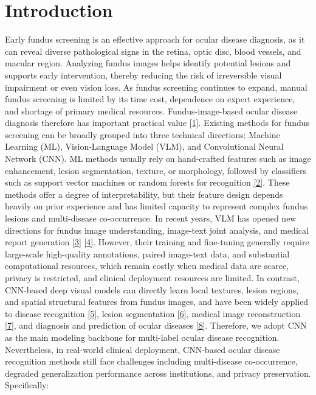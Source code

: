 
\section{Introduction}

Early fundus screening is an effective approach for ocular disease diagnosis, as it can reveal diverse pathological signs in the retina, optic disc, blood vessels, and macular region. Analyzing fundus images helps identify potential lesions and supports early intervention, thereby reducing the risk of irreversible visual impairment or even vision loss. As fundus screening continues to expand, manual fundus screening is limited by its time cost, dependence on expert experience, and shortage of primary medical resources. Fundus-image-based ocular disease diagnosis therefore has important practical value \hyperref[_Ref213949315]{{[}1{]}}. Existing methods for fundus screening can be broadly grouped into three technical directions: Machine Learning (ML), Vision-Language Model (VLM), and Convolutional Neural Network (CNN). ML methods usually rely on hand-crafted features such as image enhancement, lesion segmentation, texture, or morphology, followed by classifiers such as support vector machines or random forests for recognition \hyperref[_RefRahman2022MLFundus]{{[}2{]}}. These methods offer a degree of interpretability, but their feature design depends heavily on prior experience and has limited capacity to represent complex fundus lesions and multi-disease co-occurrence. In recent years, VLM has opened new directions for fundus image understanding, image-text joint analysis, and medical report generation \hyperref[_RefLim2024VLVOphthalmology]{{[}3{]}} \hyperref[_RefUrooj2025LLMMedicalImage]{{[}4{]}}. However, their training and fine-tuning generally require large-scale high-quality annotations, paired image-text data, and substantial computational resources, which remain costly when medical data are scarce, privacy is restricted, and clinical deployment resources are limited. In contrast, CNN-based deep visual models can directly learn local textures, lesion regions, and spatial structural features from fundus images, and have been widely applied to disease recognition \hyperref[_Ref213871637]{{[}5{]}}, lesion segmentation \hyperref[_Ref213948625]{{[}6{]}}, medical image reconstruction \hyperref[_Ref213948898]{{[}7{]}}, and diagnosis and prediction of ocular diseases \hyperref[_Ref213949262]{{[}8{]}}. Therefore, we adopt CNN as the main modeling backbone for multi-label ocular disease recognition. Nevertheless, in real-world clinical deployment, CNN-based ocular disease recognition methods still face challenges including multi-disease co-occurrence, degraded generalization performance across institutions, and privacy preservation. Specifically:

